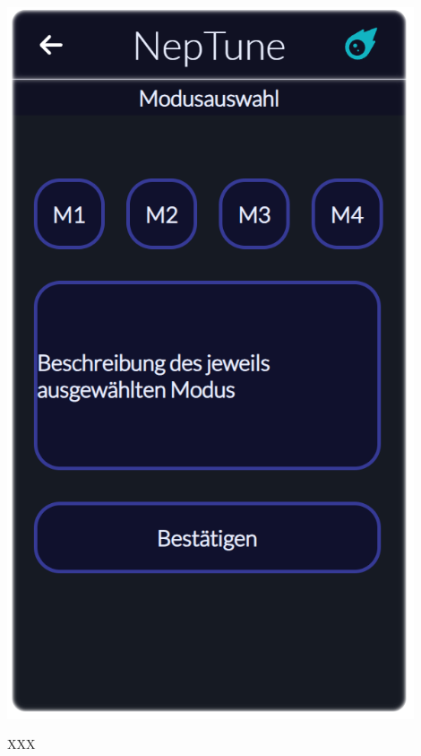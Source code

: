 \documentclass[oneside, ngerman]{sdqtechreport}
\begin{document}
\begin{minipage}{0.5\textwidth}
    \hypertarget{hostModeSelectView}{}
    \includegraphics[width=0.9\textwidth]{LATEX/Pflichtenheft/GraphicDesigns/hostModusSelectPage.png}
\end{minipage} 
\hfill
\begin{minipage}{0.5\textwidth}
    XXX
\end{minipage}
\end{document}
